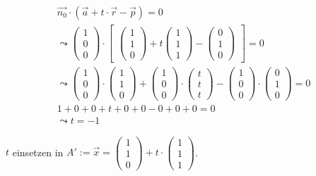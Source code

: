 \begin{gather}
\vec{n_0} \cdot (\vec{a}+t\cdot \vec{r}-\vec{p})=0\\
\leadsto 
\begin{pmatrix}
1\\0\\0
\end{pmatrix} \cdot 
\begin{bmatrix}
\begin{pmatrix}
1\\1\\0
\end{pmatrix}
+ t
\begin{pmatrix}
1\\1\\1
\end{pmatrix}
-
\begin{pmatrix}
0\\1\\0
\end{pmatrix}
\end{bmatrix} = 0\\
\leadsto
\begin{pmatrix}
1\\0\\0
\end{pmatrix}\cdot
\begin{pmatrix}
1\\1\\0
\end{pmatrix}
+
\begin{pmatrix}
1\\0\\0
\end{pmatrix}
\cdot
\begin{pmatrix}
t\\t\\t
\end{pmatrix}
-
\begin{pmatrix}
1\\0\\0
\end{pmatrix}
\cdot
\begin{pmatrix}
0\\1\\0
\end{pmatrix} =0\\
1+0+0+t+0+0-0+0+0=0\\
\leadsto t=-1
\end{gather}

\ensuremath{t} einsetzen in \ensuremath{A':= \vec{x}=\begin{pmatrix}
		1\\1\\0
	\end{pmatrix} +t\cdot\begin{pmatrix}
		1\\1\\1
\end{pmatrix}}.\\

